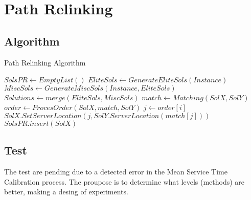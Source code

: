 \section{Path Relinking}
\subsection{Algorithm}
\begin{frame}{Path Relinking Algorithm}{}
  \footnotesize{
  \begin{algorithm}
    \hline \vspace{3pt}
    \caption{Path Relinking}\label{proc_rel}
    \vspace{3pt} \hline
    \begin{algorithmic}[0]
      \State $SolsPR \gets EmptyList()$
      \State $EliteSols \gets GenerateEliteSols(Instance)$
      \State $MiscSols \gets GenerateMiscSols(Instance,EliteSols)$
      \State $Solutions \gets merge(EliteSols,MiscSols)$
      \State $match \gets Matching(SolX,SolY)$
      \State $order \gets ProcesOrder(SolX,match,SolY)$
      \State $j \gets order[i]$
      \State $SolX.SetServerLocation(j,SolY.ServerLocation(match[j]))$
      \State $SolsPR.insert(SolX)$
      \EndIf \EndFor \EndFor \EndFor
      \EndProcedure
      \hline
    \end{algorithmic}
  \end{algorithm}}
\end{frame}

\subsection{Test}
\begin{frame}
  The test are pending due to a detected error in the Mean Service Time 
  Calibration process.
  The proupose is to determine what levels (methods) are better,
  making a desing of experiments.
\end{frame}
